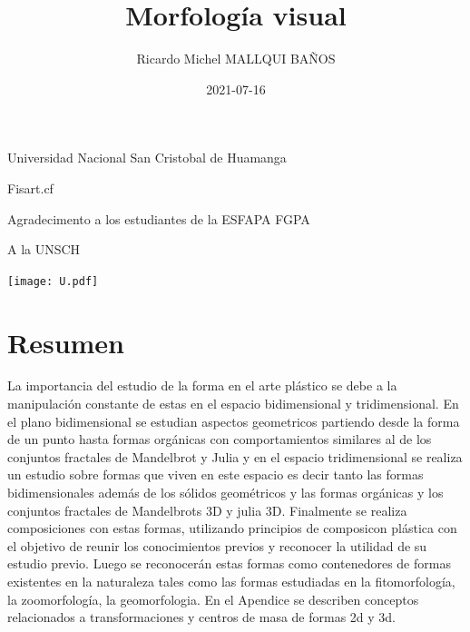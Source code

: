 \documentclass[16pt,]{krantz}
\title{Morfología visual}
\author{Ricardo Michel MALLQUI BAÑOS}
\institute{Universidad Nacional San Cristóbal De Huamanga}
\date{2021-07-16}
\theoremstyle{definition}
\theoremstyle{definition}
\theoremstyle{definition}
\theoremstyle{definition}
\theoremstyle{remark}
\begin{document}
\maketitle

\thispagestyle{empty}
\begin{flushright}
Universidad Nacional San Cristobal de Huamanga

Fisart.cf

Agradecimento a los estudiantes de la ESFAPA FGPA

A la UNSCH

\texttt{[image: U.pdf]}
\end{flushright}

{
\hypersetup{linkcolor=}
\setcounter{tocdepth}{2}
\tableofcontents
}
\listoftables
\listoffigures
\newcommand{\N}{\mathbb{N}}
\newcommand{\R}{\mathbb{R}}
\newcommand{\CC}{\mathbb{C}}
\newcommand{\I}{\mathbb{I}}
\newcommand{\f}{\mathbb{f}}
\newcommand{\X}{\mathbb{X}}
\newcommand{\D}{\mathbb{D}}
\newcommand{\Z}{\mathbb{Z}}
\newcommand{\Q}{\mathbb{Q}}
\newcommand{\norm}[1]{\left\Vert#1\right\Vert}
\newcommand{\abs}[1]{\left\vert#1\right\vert}
\newcommand{\set}[1]{\left\{#1\right\}}
\newcommand{\seq}[1]{\left<#1\right>}
\newcommand{\co}[1]{\left[#1\right]}
\newcommand{\cc}[1]{\left(#1\right)}
\newcommand{\J}{\mathcal{J}}
\newcommand{\K}{\mathcal{K}}
\newcommand{\M}{\mathcal{M}}
\newcommand{\F}{\mathcal{F}}

\hypertarget{resumen}{%
\chapter*{Resumen}\label{resumen}}


La importancia del estudio de la forma en el arte plástico se debe a la manipulación constante de estas en el espacio bidimensional y tridimensional. En el plano bidimensional se estudian aspectos geometricos partiendo desde la forma de un punto hasta formas orgánicas con comportamientos similares al de los conjuntos fractales de Mandelbrot y Julia y en el espacio tridimensional se realiza un estudio sobre formas que viven en este espacio es decir tanto las formas bidimensionales además de los sólidos geométricos y las formas orgánicas y los conjuntos fractales de Mandelbrots 3D y julia 3D. Finalmente se realiza composiciones con estas formas, utilizando principios de composicon plástica con el objetivo de reunir los conocimientos previos y reconocer la utilidad de su estudio previo. Luego se reconocerán estas formas como contenedores de formas existentes en la naturaleza tales como las formas estudiadas en la fitomorfología, la zoomorfología, la geomorfologia. En el Apendice se describen conceptos relacionados a transformaciones y centros de masa de formas 2d y 3d.
\end{document}
